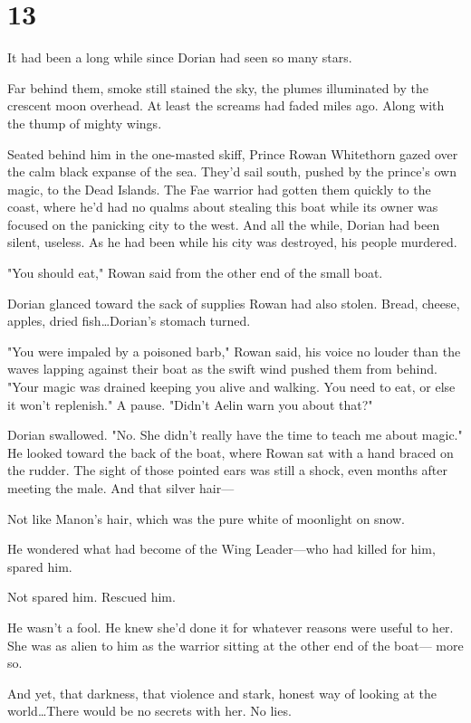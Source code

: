 
\chapter{13}

It had been a long while since Dorian had seen so many stars.

Far behind them, smoke still stained the sky, the plumes illuminated by the crescent moon overhead.
At least the screams had faded miles ago.
Along with the thump of mighty wings.

Seated behind him in the one-masted skiff, Prince Rowan Whitethorn gazed over the calm black expanse of the sea.
They'd sail south, pushed by the prince's own magic, to the Dead Islands.
The Fae warrior had gotten them quickly to the coast, where he'd had no qualms about stealing this boat while its owner was focused on the panicking city to the west.
And all the while, Dorian had been silent, useless.
As he had been while his city was destroyed, his people murdered.

"You should eat," Rowan said from the other end of the small boat.

Dorian glanced toward the sack of supplies Rowan had also stolen.
Bread, cheese, apples, dried fish\ldots Dorian's stomach turned.

"You were impaled by a poisoned barb," Rowan said, his voice no louder than the waves lapping against their boat as the swift wind pushed them from behind.
"Your magic was drained keeping you alive and walking.
You need to eat, or else it won't replenish."
A pause.
"Didn't Aelin warn you about that?"

Dorian swallowed.
"No.
She didn't really have the time to teach me about magic."
He looked toward the back of the boat, where Rowan sat with a hand braced on the rudder.
The sight of those pointed ears was still a shock, even months after meeting the male.
And that silver hair---

Not like Manon's hair, which was the pure white of moonlight on snow.

He wondered what had become of the Wing Leader---who had killed for him, spared him.

Not spared him.
Rescued him.

He wasn't a fool.
He knew she'd done it for whatever reasons were useful to her.
She was as alien to him as the warrior sitting at the other end of the boat--- more so.

And yet, that darkness, that violence and stark, honest way of looking at the world\ldots There would be no secrets with her.
No lies.

